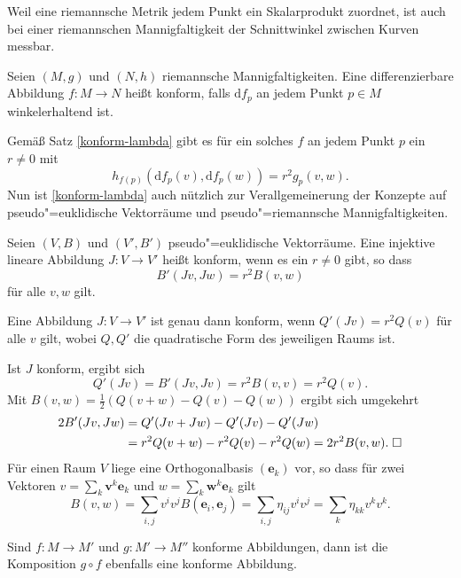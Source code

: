 Weil eine riemannsche Metrik jedem Punkt ein Skalarprodukt zuordnet,
ist auch bei einer riemannschen Mannigfaltigkeit der Schnittwinkel
zwischen Kurven messbar.
\begin{definition}
Seien $(M,g)$ und $(N,h)$ riemannsche Mannigfaltigkeiten. Eine
differenzierbare Abbildung $f\colon M\to N$ heißt konform,
falls $\mathrm df_p$ an jedem Punkt $p\in M$ winkelerhaltend ist.
\end{definition}
Gemäß Satz \ref{konform-lambda} gibt es für ein solches $f$ 
an jedem Punkt $p$ ein $r\ne 0$ mit
\begin{equation}
h_{f(p)}(\mathrm df_p(v),\mathrm df_p(w)) = r^2 g_p(v,w).
\end{equation}
Nun ist \ref{konform-lambda} auch nützlich zur Verallgemeinerung
der Konzepte auf pseudo"=euklidische Vektorräume
und pseudo"=riemannsche Mannigfaltigkeiten.
\begin{definition}
Seien $(V,B)$ und $(V',B')$ pseudo"=euklidische Vektorräume.
Eine injektive lineare Abbildung $J: V\to V'$ heißt konform, wenn
es ein $r\ne 0$ gibt, so dass%
\begin{equation}
B'(Jv,Jw) = r^2 B(v,w)
\end{equation}
für alle $v,w$ gilt.
\end{definition}
\begin{corollary}\label{konform-QF}
Eine Abbildung $J\colon V\to V'$ ist genau dann konform, wenn
$Q'(Jv)=r^2 Q(v)$ für alle $v$ gilt, wobei $Q,Q'$
die quadratische Form des jeweiligen Raums ist.
\end{corollary}
 Ist $J$ konform, ergibt sich
\begin{equation}
Q'(Jv) = B'(Jv,Jv) = r^2 B(v,v) = r^2 Q(v).
\end{equation}
Mit $B(v,w) = \frac{1}{2}(Q(v+w)-Q(v)-Q(w))$ ergibt sich umgekehrt
\begin{align}
2B'(Jv,Jw) &= Q'(Jv+Jw)-Q'(Jv)-Q'(Jw)\\
&= r^2 Q(v+w) - r^2 Q(v) - r^2 Q(w)
= 2r^2 B(v,w).\;\Box
\end{align}
Für einen Raum $V$ liege eine Orthogonalbasis $(\mathbf e_k)$ vor, so dass
für zwei Vektoren $v=\sum_k\mathbf v^k\mathbf e_k$ und $w=\sum_k\mathbf w^k\mathbf e_k$
gilt
\begin{equation}
B(v,w) = \sum_{i,j} v^i v^j B(\mathbf e_i,\mathbf e_j)
= \sum_{i,j}\eta_{ij} v^i v^j = \sum_{k}\eta_{kk}v^k v^k.
\end{equation}
\begin{corollary}
Sind $f\colon M\to M'$ und $g\colon M'\to M''$ konforme Abbildungen,
dann ist die Komposition $g\circ f$ ebenfalls eine konforme Abbildung.
\end{corollary}
